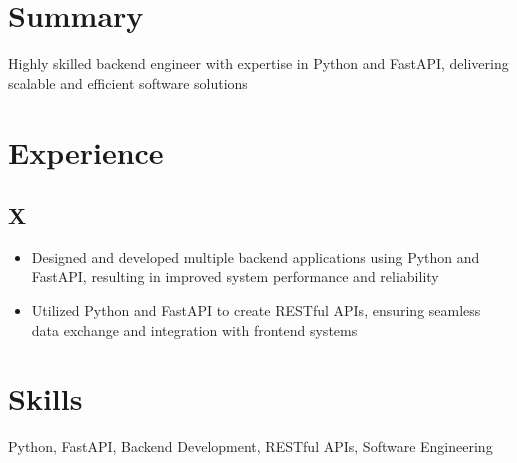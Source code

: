 \documentclass[11pt]{article}
\begin{document}
\section*{Summary}
Highly skilled backend engineer with expertise in Python and FastAPI, delivering scalable and efficient software solutions

\section*{Experience}
\subsection*{X}
\begin{itemize}
\item Designed and developed multiple backend applications using Python and FastAPI, resulting in improved system performance and reliability
\item Utilized Python and FastAPI to create RESTful APIs, ensuring seamless data exchange and integration with frontend systems
\end{itemize}

\section*{Skills}
Python, FastAPI, Backend Development, RESTful APIs, Software Engineering
\end{document}
